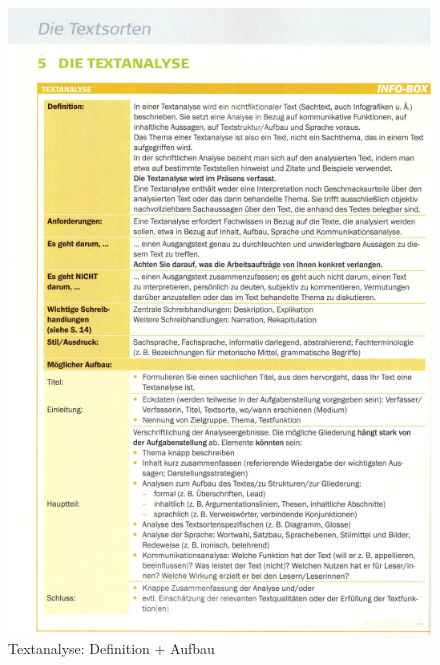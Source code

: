 \begin{figure}[h][p]
    \centering
    \includegraphics[scale=0.8]{pics/Screenshot from 2023-02-06 12-30-44.png}
    \caption{Textanalyse: Definition + Aufbau}
    \label{fig:impl:Textanalyse1}
\end{figure}

